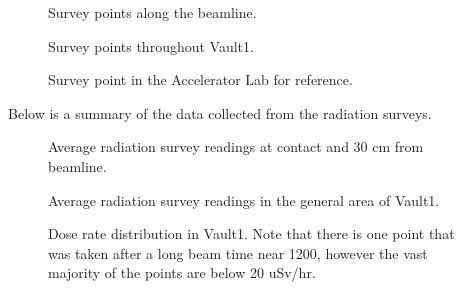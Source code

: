 \documentclass[letterpaper,10pt,english]{sphinxmanual}
\begin{document}
\begin{figure}[htbp]
\centering
\capstart

\noindent{}
\caption{ Survey points along the beamline.}\label{\detokenize{user_documentation/radiation_data:id1}}\end{figure}

\begin{figure}[htbp]
\centering
\capstart

\noindent{}
\caption{ Survey points throughout Vault\sphinxhyphen{}1.}\label{\detokenize{user_documentation/radiation_data:id2}}\end{figure}

\begin{figure}[htbp]
\centering
\capstart

\noindent{}
\caption{ Survey point in the Accelerator Lab for reference.}\label{\detokenize{user_documentation/radiation_data:id3}}\end{figure}

\sphinxAtStartPar
Below is a summary of the data collected from the radiation surveys.

\begin{figure}[htbp]
\centering
\capstart

\noindent{}
\caption{ Average radiation survey readings at contact and 30 cm from beamline.}\label{\detokenize{user_documentation/radiation_data:id4}}\end{figure}

\begin{figure}[htbp]
\centering
\capstart

\noindent{}
\caption{ Average radiation survey readings in the general area of Vault\sphinxhyphen{}1.}\label{\detokenize{user_documentation/radiation_data:id5}}\end{figure}

\begin{figure}[htbp]
\centering
\capstart

\noindent{}
\caption{ Dose rate distribution in Vault\sphinxhyphen{}1.
Note that there is one point that was taken after a long beam time near 1200, however the vast majority of the points are below 20 uSv/hr.}\label{\detokenize{user_documentation/radiation_data:id6}}\end{figure}
\end{document}
